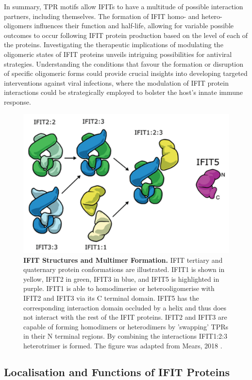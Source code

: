 In summary, TPR motifs allow IFITs to have a multitude of possible interaction partners, including themselves. The formation of IFIT homo- and hetero-oligomers influences their function and half-life, allowing for variable possible outcomes to occur following IFIT protein production based on the level of each of the proteins. Investigating the therapeutic implications of modulating the oligomeric states of IFIT proteins unveils intriguing possibilities for antiviral strategies. Understanding the conditions that favour the formation or disruption of specific oligomeric forms could provide crucial insights into developing targeted interventions against viral infections, where the modulation of IFIT protein interactions could be strategically employed to bolster the host's innate immune response.

\begin{figure}
    \centering
    \includegraphics[width=0.75\linewidth]{04. Introduction//Figs/05. IFIT-complexes.png}
    \caption[IFIT Structures and Multimer Formation.]{\textbf{IFIT Structures and Multimer Formation.} IFIT tertiary and quaternary protein conformations are illustrated. IFIT1 is shown in yellow, IFIT2 in green, IFIT3 in blue, and IFIT5 is highlighted in purple. IFIT1 is able to homodimerise or heterooligomerise with IFIT2 and IFIT3 via its C terminal domain. IFIT5 has the corresponding interaction domain occluded by a helix and thus does not interact with the rest of the IFIT proteins. IFIT2 and IFIT3 are capable of forming homodimers or heterodimers by 'swapping' TPRs in their N terminal regions. By combining the interactions IFIT1:2:3 heterotrimer is formed. The figure was adapted from Mears, 2018 \cite{Mears2018BetterResponse}.}
    \label{fig:IFIT Structures and Multimer Formation.}
\end{figure}

\subsection{Localisation and Functions of IFIT Proteins} \label{subsec:Localisation and Functions of IFIT Proteins}
